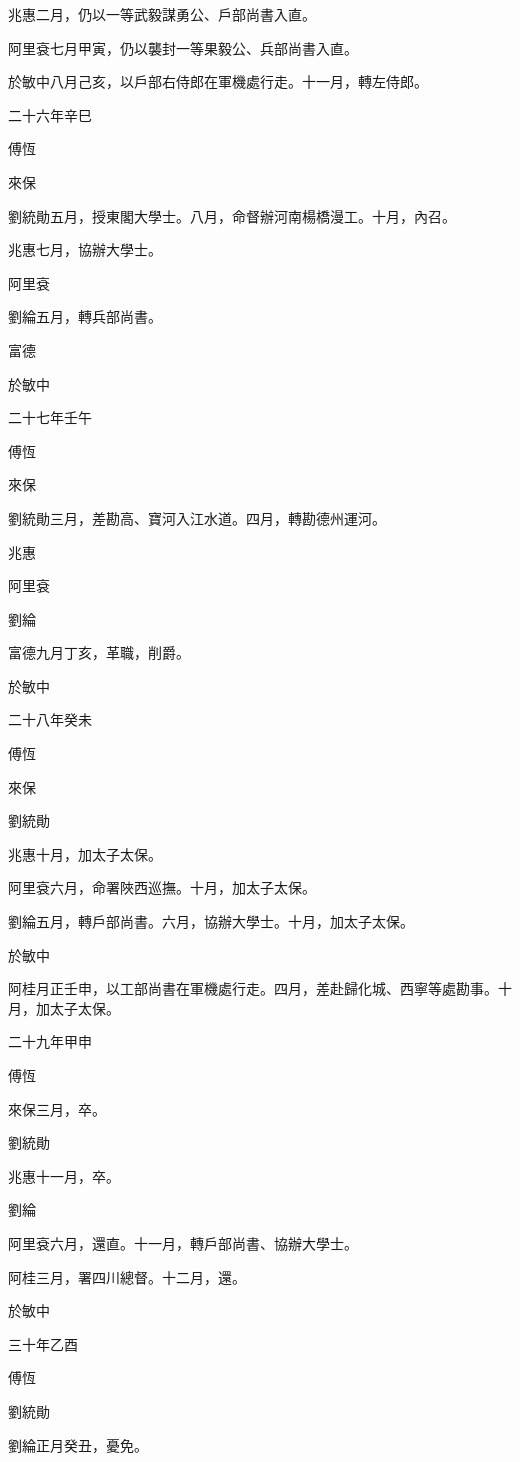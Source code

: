 \begin{pinyinscope}
兆惠二月，仍以一等武毅謀勇公、戶部尚書入直。

阿里袞七月甲寅，仍以襲封一等果毅公、兵部尚書入直。

於敏中八月己亥，以戶部右侍郎在軍機處行走。十一月，轉左侍郎。

二十六年辛巳

傅恆

來保

劉統勛五月，授東閣大學士。八月，命督辦河南楊橋漫工。十月，內召。

兆惠七月，協辦大學士。

阿里袞

劉綸五月，轉兵部尚書。

富德

於敏中

二十七年壬午

傅恆

來保

劉統勛三月，差勘高、寶河入江水道。四月，轉勘德州運河。

兆惠

阿里袞

劉綸

富德九月丁亥，革職，削爵。

於敏中

二十八年癸未

傅恆

來保

劉統勛

兆惠十月，加太子太保。

阿里袞六月，命署陜西巡撫。十月，加太子太保。

劉綸五月，轉戶部尚書。六月，協辦大學士。十月，加太子太保。

於敏中

阿桂月正壬申，以工部尚書在軍機處行走。四月，差赴歸化城、西寧等處勘事。十月，加太子太保。

二十九年甲申

傅恆

來保三月，卒。

劉統勛

兆惠十一月，卒。

劉綸

阿里袞六月，還直。十一月，轉戶部尚書、協辦大學士。

阿桂三月，署四川總督。十二月，還。

於敏中

三十年乙酉

傅恆

劉統勛

劉綸正月癸丑，憂免。


\end{pinyinscope}
